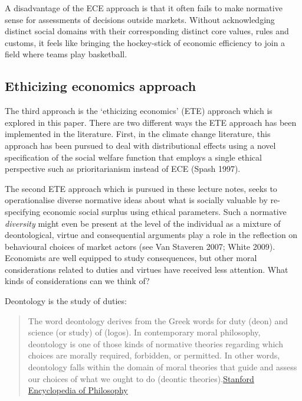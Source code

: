 \documentclass[
]{book}
\begin{document}
A disadvantage of the ECE approach is that it often fails to make normative sense for assessments of decisions outside markets. Without acknowledging distinct social domains with their corresponding distinct core values, rules and customs, it feels like bringing the hockey-stick of economic efficiency to join a field where teams play basketball.

\hypertarget{ethicizing-economics-approach}{%
\subsection{Ethicizing economics approach}\label{ethicizing-economics-approach}}

The third approach is the `ethicizing economics' (ETE) approach which is explored in this paper. There are two different ways the ETE approach has been implemented in the literature. First, in the climate change literature, this approach has been pursued to deal with distributional effects using a novel specification of the social welfare function that employs a single ethical perspective such as prioritarianism instead of ECE (Spash 1997).

The second ETE approach which is pursued in these lecture notes, seeks to operationalise diverse normative ideas about what is socially valuable by re-specifying economic social surplus using ethical parameters. Such a normative \emph{diversity} might even be present at the level of the individual as a mixture of deontological, virtue and consequential arguments play a role in the reflection on behavioural choices of market actors (see Van Staveren 2007; White 2009). Economists are well equipped to study consequences, but other moral considerations related to duties and virtues have received less attention. What kinds of considerations can we think of?

Deontology is the study of duties:

\begin{quote}
The word deontology derives from the Greek words for duty (deon) and science (or study) of (logos). In contemporary moral philosophy, deontology is one of those kinds of normative theories regarding which choices are morally required, forbidden, or permitted. In other words, deontology falls within the domain of moral theories that guide and assess our choices of what we ought to do (deontic theories).\href{https://plato.stanford.edu/entries/ethics-deontological/}{Stanford Encyclopedia of Philosophy}
\end{quote}
\end{document}
